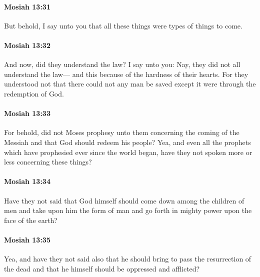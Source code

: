 		\paragraph{Mosiah 13:31} %
			\label{MOSIAH-13-31}

			But behold, I say unto you that all these things were types of things to come.

		\paragraph{Mosiah 13:32} %
			\label{MOSIAH-13-32}

			And now, did they understand the law?
			I say unto you:
			Nay, they did not all understand the law---
			and this because of the hardness of their hearts.
			For they understood not that there could not any man be saved
			except it were through the redemption of God.

		\paragraph{Mosiah 13:33} %
			\label{MOSIAH-13-33}

			For behold, did not Moses prophesy unto them
			concerning the coming of the Messiah
			and that God should redeem his people?
			Yea, and even all the prophets which have prophesied ever since the world began,
			have they not spoken more or less concerning these things?

		\paragraph{Mosiah 13:34} %
			\label{MOSIAH-13-34}

			Have they not said
			that God himself should come down among the children of men
			and take upon him the form of man
			and go forth in mighty power upon the face of the earth?

		\paragraph{Mosiah 13:35} %
			\label{MOSIAH-13-35}

			Yea, and have they not said also
			that he should bring to pass the resurrection of the dead
			and that he himself should be oppressed and afflicted?
			
